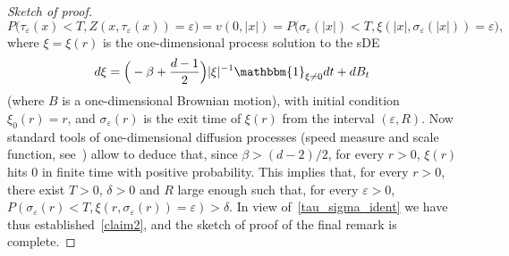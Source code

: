 \documentclass[a4paper,10pt]{article}
\newcommand\1{\mathbbm{1}}
\newcommand{\eps}{\varepsilon}
\numberwithin{equation}{section}
\begin{document}
\begin{proof}[Sketch of proof]
\begin{equation}
\label{tau_sigma_ident}
P\big(\tau_\eps(x)<T,Z(x,\tau_\eps(x))=\eps\big)=v(0,|x|)=P\big(\sigma_\eps(|x|)<T,\xi(|x|,\sigma_\eps(|x|))=\eps\big) , 
\end{equation}
where $\xi=\xi(r)$ is the one-dimensional process solution to the sDE
\begin{equation*}
d\xi= \Big(-\beta+\frac{d-1}{2} \Big) |\xi|^{-1} \1_{\xi\neq0} dt + dB_t
\end{equation*}
(where $B$ is a one-dimensional Brownian motion), with initial condition $\xi_0(r)=r$, and $\sigma_\eps(r)$ is the exit time of $\xi(r)$ from the interval $(\eps,R)$. Now standard tools of one-dimensional diffusion processes (speed measure and scale function, see~\cite[Chapter~16]{BREIMAN}) allow to deduce that, since $\beta>(d-2)/2$, for every $r>0$, $\xi(r)$ hits $0$ in finite time with positive probability. This implies that, for every $r>0$, there exist $T>0$, $\delta>0$ and $R$ large enough such that, for every $\eps>0$, $P(\sigma_\eps(r)<T,\xi(r,\sigma_\eps(r))=\eps)>\delta$. In view of~\eqref{tau_sigma_ident} we have thus established~\eqref{claim2}, and the sketch of proof of the final remark is complete.
\end{proof}


%
%

\end{document}
